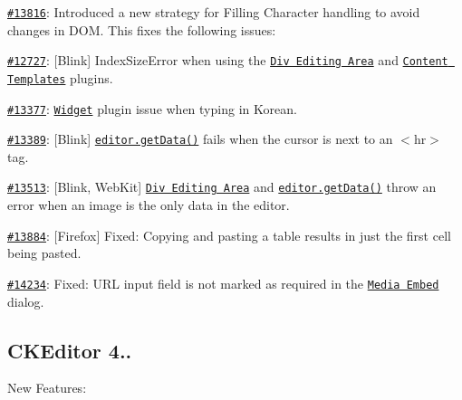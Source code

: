 \begin{DoxyItemize}
\item \href{http://dev.ckeditor.com/ticket/13816}{\tt \#13816}\+: Introduced a new strategy for Filling Character handling to avoid changes in D\+OM. This fixes the following issues\+:
\begin{DoxyItemize}
\item \href{http://dev.ckeditor.com/ticket/12727}{\tt \#12727}\+: \mbox{[}Blink\mbox{]} {\ttfamily Index\+Size\+Error} when using the \href{http://ckeditor.com/addon/divarea}{\tt Div Editing Area} and \href{http://ckeditor.com/addon/templates}{\tt Content Templates} plugins.
\item \href{http://dev.ckeditor.com/ticket/13377}{\tt \#13377}\+: \href{http://ckeditor.com/addon/widget}{\tt Widget} plugin issue when typing in Korean.
\item \href{http://dev.ckeditor.com/ticket/13389}{\tt \#13389}\+: \mbox{[}Blink\mbox{]} \href{http://docs.ckeditor.com/#!/api/CKEDITOR.editor-method-getData}{\tt {\ttfamily editor.\+get\+Data()}} fails when the cursor is next to an {\ttfamily $<$hr$>$} tag.
\item \href{http://dev.ckeditor.com/ticket/13513}{\tt \#13513}\+: \mbox{[}Blink, Web\+Kit\mbox{]} \href{http://ckeditor.com/addon/divarea}{\tt Div Editing Area} and \href{http://docs.ckeditor.com/#!/api/CKEDITOR.editor-method-getData}{\tt {\ttfamily editor.\+get\+Data()}} throw an error when an image is the only data in the editor.
\end{DoxyItemize}
\item \href{http://dev.ckeditor.com/ticket/13884}{\tt \#13884}\+: \mbox{[}Firefox\mbox{]} Fixed\+: Copying and pasting a table results in just the first cell being pasted.
\item \href{http://dev.ckeditor.com/ticket/14234}{\tt \#14234}\+: Fixed\+: U\+RL input field is not marked as required in the \href{http://ckeditor.com/addon/embed}{\tt Media Embed} dialog.
\end{DoxyItemize}

\subsection*{C\+K\+Editor 4..}

New Features\+:


